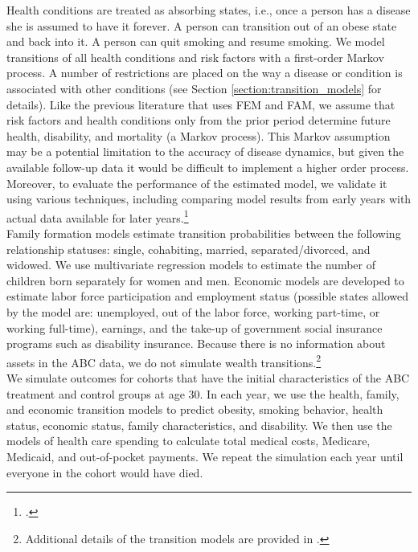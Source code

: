 \noindent Health conditions are treated as absorbing states, i.e., once a person has a disease she is assumed to have it forever. A person can transition out of an obese state and back into it.  A person can quit smoking and resume smoking. We model transitions of all health conditions and risk factors with a first-order Markov process. A number of restrictions are placed on the way a disease or condition is associated with other conditions (see Section \ref{section:transition_models} for details). Like the previous literature that uses FEM and FAM, we assume that risk factors and health conditions only from the prior period determine future health, disability, and mortality (a Markov process). This Markov assumption may be a potential limitation to the accuracy of disease dynamics, but given the available follow-up data it would be difficult to implement a higher order process. Moreover, to evaluate the performance of the estimated model, we validate it using various techniques, including comparing model results from early years with actual data available for later years.\footnote{\citet{Goldman_etal_2015_Future-America-Model}.} \\

\noindent Family formation models estimate transition probabilities between the following relationship statuses:  single, cohabiting, married, separated/divorced, and widowed. We use multivariate regression models to estimate the number of children born separately for women and men. Economic models are developed to estimate labor force participation and employment status (possible states allowed by the model are: unemployed, out of the labor force, working part-time, or working full-time), earnings, and the take-up of government social insurance programs such as disability insurance. Because there is no information about assets in the ABC data, we do not simulate wealth transitions.\footnote{Additional details of the transition models are provided in \citet{Goldman_etal_2015_Future-America-Model}.} \\

\noindent We simulate outcomes for cohorts that have the initial characteristics of the ABC treatment and control groups at age 30. In each year, we use the health, family, and economic transition models to predict obesity, smoking behavior, health status, economic status, family characteristics, and disability. We then use the models of health care spending to calculate total medical costs, Medicare, Medicaid, and out-of-pocket payments. We repeat the simulation each year until everyone in the cohort would have died. \\

